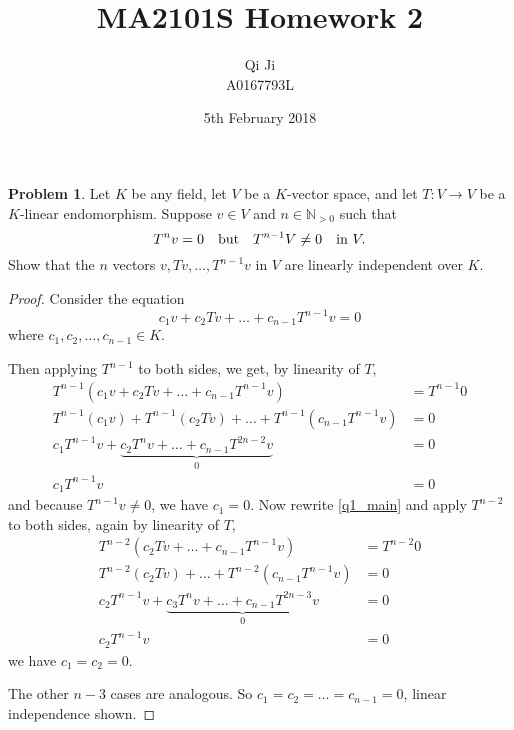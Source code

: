 \documentclass[11pt]{article}
\author{Qi Ji\\\small A0167793L}
\title{MA2101S Homework 2}
\date{5th February 2018}
\theoremstyle{definition}
\newtheorem{problem}{Problem}
\numberwithin{lemma}{problem}
\numberwithin{equation}{problem}
\newcommand{\N}{\mathbb{N}}
\begin{document}
\maketitle

\begin{problem}
    Let $K$ be any field, let $V$ be a $K$-vector space, and let
    $T: V\to V$ be a $K$-linear endomorphism.
    Suppose $v\in V$ and $n \in \N_{>0}$ such that
    $$T^n v = 0 \text{\quad but\quad } T^{n-1}V\ne 0 \text{\quad in }V.$$
    Show that the $n$ vectors $v, Tv, \dots, T^{n-1}v$ in $V$
    are linearly independent over $K$.
\end{problem}
\begin{proof}
    Consider the equation
    \begin{equation} \label{q1_main}
        c_1v + c_2Tv + \dots + c_{n-1}T^{n-1}v = 0
    \end{equation}
    where $c_1, c_2, \dots, c_{n-1} \in K$.

    Then applying $T^{n-1}$ to both sides, we get, by linearity of $T$,
    \begin{align*}
        T^{n-1}\left( c_1v + c_2Tv + \dots + c_{n-1}T^{n-1}v \right)    &= T^{n-1} 0    \\
        T^{n-1}(c_1v) + T^{n-1}(c_2Tv) + \dots + T^{n-1}(c_{n-1}T^{n-1}v) &= 0  \\
        c_1T^{n-1}v + \underbrace{c_2T^nv + \dots + c_{n-1}T^{2n-2}v}_0 &= 0  \\
        c_1T^{n-1}v &= 0
    \end{align*}
    and because $T^{n-1}v \ne 0$, we have $c_1 = 0$.
    Now rewrite \eqref{q1_main} and apply $T^{n-2}$ to both sides, again by linearity of $T$,
    \begin{align*}
        T^{n-2}\left( c_2Tv + \dots + c_{n-1}T^{n-1}v \right)    &= T^{n-2} 0    \\
        T^{n-2}(c_2Tv) + \dots + T^{n-2}(c_{n-1}T^{n-1}v) &= 0  \\
        c_2T^{n-1}v + \underbrace{c_3T^nv + \dots + c_{n-1}T^{2n-3}v}_0 &= 0  \\
        c_2T^{n-1}v &= 0
    \end{align*}
    we have $c_1 = c_2 = 0$.

    The other $n-3$ cases are analogous. So $c_1 = c_2 = \dots = c_{n-1} = 0$, linear independence shown.
\end{proof}
\end{document}
